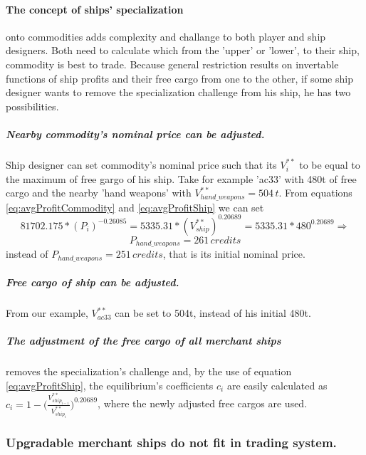 \documentclass[]{article}
\begin{document}
\paragraph{The concept of ships' specialization} onto commodities adds complexity and challange to both player and ship designers. Both need to calculate which from the 'upper' or 'lower', to their ship, commodity is best to trade. Because general restriction results on invertable functions of ship profits and their free cargo from one to the other, if some ship designer wants to remove the specialization challenge from his ship, he has two possibilities.
\subparagraph*{Nearby commodity's nominal price can be adjusted.} Ship designer can set commodity's nominal price such that its $V^{**}_{i}$ to be equal to the maximum of free gargo of his ship. Take for example 'ac33' with 480t of free cargo and the nearby 'hand weapons' with $V^{**}_{hand\_weapons}=504\,t$. From equations \eqref{eq:avgProfitCommodity} and \eqref{eq:avgProfitShip} we can set
\[81702.175*(P_{i})^{-0.26085}=5335.31*(V^{**}_{ship})^{0.20689}=5335.31*480^{0.20689}\Rightarrow\]
\[P_{hand\_weapons}=261\,credits\]
instead of $P_{hand\_weapons}=251\,credits$, that is its initial nominal price.
\subparagraph*{Free cargo of ship can be adjusted.} From our example, $V^{**}_{ac33}$ can be set to 504t, instead of his initial 480t.
\subparagraph{The adjustment of the free cargo of all merchant ships} removes the specialization's challenge and, by the use of equation \eqref{eq:avgProfitShip}, the equilibrium's coefficients $c_{i}$ are easily calculated as $c_{i}=1-\big(\tfrac{V^{**}_{ship_{i-1}}}{V^{**}_{ship_{i}}}\big)^{0.20689}$, where the newly adjusted free cargos are used.

\subsubsection{Upgradable merchant ships do not fit in trading system.} 
\end{document}
